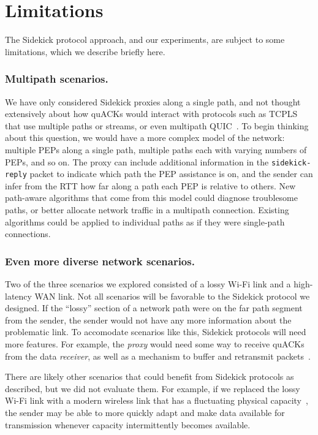 \section{Limitations}
\label{sec:sidekick:limitations}

The Sidekick protocol approach, and our experiments, are subject to some
limitations, which we describe briefly here.

\subsubsection{Multipath scenarios.}
We have only considered Sidekick proxies along a single path, and not thought
extensively about how quACKs would interact with protocols such as
\mbox{TCPLS}~\cite{rochet2020tcpls} that use multiple paths or streams,
or even multipath QUIC~\cite{de2017multipath}.
To begin thinking about this question, we would have a more complex model of the
network: multiple PEPs along a single path, multiple paths each with varying
numbers of PEPs, and so on. The proxy can include additional information in the
\texttt{sidekick-reply} packet to indicate which path the PEP assistance is on, and the
sender can infer from the RTT how far along a path each PEP is relative to
others. New path-aware algorithms that come from this model could diagnose
troublesome paths, or better allocate network traffic in a multipath
connection. Existing algorithms could be applied to individual paths as if they
were single-path connections.

\subsubsection{Even more diverse network scenarios.}
Two of the three scenarios we explored consisted of a lossy Wi-Fi link and a
high-latency WAN link. Not all scenarios will be favorable to the
Sidekick protocol we designed.
If the ``lossy'' section of a network path were on the far path segment from the
sender, the sender would not have any more information about the problematic
link. To accomodate scenarios like this, Sidekick protocols will need
more features. For example, the \emph{proxy} would need some way to receive
quACKs from the data \emph{receiver}, as well as a mechanism to buffer and
retransmit packets~\cite{balakrishnan1995snoop,caini2006pepsal}.

There are likely other scenarios that could benefit from Sidekick protocols as
described, but we did not evaluate them. For example, if we replaced the lossy
Wi-Fi link with a modern wireless link that has a fluctuating physical
capacity~\cite{niu2015survey,burchardt2014vlc,koenig2013wireless}, the sender
may be able to more quickly adapt and make data available for transmission
whenever capacity intermittently becomes available.

